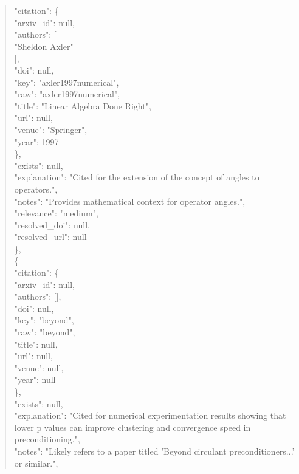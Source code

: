 \documentclass[11pt]{article}
\begin{document}
\begin{quote}
      "citation": \{\\
        "arxiv\_id": null,\\
        "authors": [\\
          "Sheldon Axler"\\
        ],\\
        "doi": null,\\
        "key": "axler1997numerical",\\
        "raw": "axler1997numerical",\\
        "title": "Linear Algebra Done Right",\\
        "url": null,\\
        "venue": "Springer",\\
        "year": 1997\\
      \},\\
      "exists": null,\\
      "explanation": "Cited for the extension of the concept of angles to operators.",\\
      "notes": "Provides mathematical context for operator angles.",\\
      "relevance": "medium",\\
      "resolved\_doi": null,\\
      "resolved\_url": null\\
    \},\\
    \{\\
      "citation": \{\\
        "arxiv\_id": null,\\
        "authors": [],\\
        "doi": null,\\
        "key": "beyond",\\
        "raw": "beyond",\\
        "title": null,\\
        "url": null,\\
        "venue": null,\\
        "year": null\\
      \},\\
      "exists": null,\\
      "explanation": "Cited for numerical experimentation results showing that lower p values can improve clustering and convergence speed in preconditioning.",\\
      "notes": "Likely refers to a paper titled 'Beyond circulant preconditioners...' or similar.",\\

\end{quote}
\end{document}
